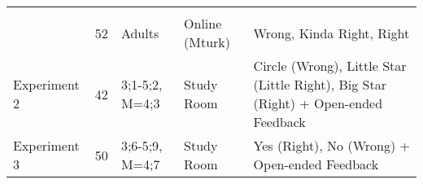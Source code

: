 \documentclass[,man,floatsintext]{apa6}
\begin{document}
\begin{longtable}[]{@{}lllll@{}}
\begin{minipage}[t]{0.34\columnwidth}
\end{minipage}\tabularnewline
\begin{minipage}[t]{0.16\columnwidth}\raggedright
\strut
\end{minipage} & \begin{minipage}[t]{0.01\columnwidth}\raggedright
52\strut
\end{minipage} & \begin{minipage}[t]{0.17\columnwidth}\raggedright
Adults\strut
\end{minipage} & \begin{minipage}[t]{0.17\columnwidth}\raggedright
Online (Mturk)\strut
\end{minipage} & \begin{minipage}[t]{0.34\columnwidth}\raggedright
Wrong, Kinda Right, Right\strut
\end{minipage}\tabularnewline
\begin{minipage}[t]{0.16\columnwidth}\raggedright
Experiment 2\strut
\end{minipage} & \begin{minipage}[t]{0.01\columnwidth}\raggedright
42\strut
\end{minipage} & \begin{minipage}[t]{0.17\columnwidth}\raggedright
3;1-5;2, M=4;3\strut
\end{minipage} & \begin{minipage}[t]{0.17\columnwidth}\raggedright
Study Room\strut
\end{minipage} & \begin{minipage}[t]{0.34\columnwidth}\raggedright
Circle (Wrong), Little Star (Little Right), Big Star (Right) + Open-ended Feedback\strut
\end{minipage}\tabularnewline
\begin{minipage}[t]{0.16\columnwidth}\raggedright
Experiment 3\strut
\end{minipage} & \begin{minipage}[t]{0.01\columnwidth}\raggedright
50\strut
\end{minipage} & \begin{minipage}[t]{0.17\columnwidth}\raggedright
3;6-5;9, M=4;7\strut
\end{minipage} & \begin{minipage}[t]{0.17\columnwidth}\raggedright
Study Room\strut
\end{minipage} & \begin{minipage}[t]{0.34\columnwidth}\raggedright
Yes (Right), No (Wrong) + Open-ended Feedback\strut
\end{minipage}\tabularnewline
\bottomrule
\end{longtable}
\end{document}
